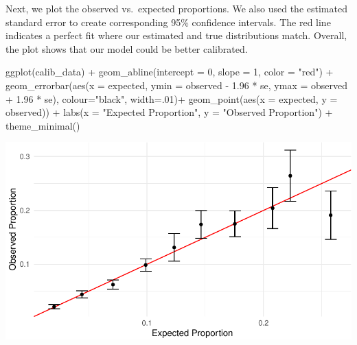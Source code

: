 \documentclass[
  letterpaper,
]{latex/krantz}
\makeatletter
\newenvironment{Shaded}{\begin{snugshade}}{\end{snugshade}}
\newcommand{\AttributeTok}[1]{\textcolor[rgb]{0.40,0.45,0.13}{#1}}
\newcommand{\DecValTok}[1]{\textcolor[rgb]{0.68,0.00,0.00}{#1}}
\newcommand{\FloatTok}[1]{\textcolor[rgb]{0.68,0.00,0.00}{#1}}
\newcommand{\FunctionTok}[1]{\textcolor[rgb]{0.28,0.35,0.67}{#1}}
\newcommand{\NormalTok}[1]{\textcolor[rgb]{0.00,0.23,0.31}{#1}}
\newcommand{\SpecialCharTok}[1]{\textcolor[rgb]{0.37,0.37,0.37}{#1}}
\newcommand{\StringTok}[1]{\textcolor[rgb]{0.13,0.47,0.30}{#1}}
\newenvironment{kframe}{%
\medskip{}
\setlength{\fboxsep}{.8em}
 \def\at@end@of@kframe{}%
 \ifinner\ifhmode%
  \def\at@end@of@kframe{\end{minipage}}%
  \begin{minipage}{\columnwidth}%
 \fi\fi%
 \def\FrameCommand##1{\hskip\@totalleftmargin \hskip-\fboxsep
 \colorbox{shadecolor}{##1}\hskip-\fboxsep
     \hskip-\linewidth \hskip-\@totalleftmargin \hskip\columnwidth}%
 \MakeFramed {\advance\hsize-\width
   \@totalleftmargin\z@ \linewidth\hsize
   \@setminipage}}%
 {\par\unskip\endMakeFramed%
 \at@end@of@kframe}
\renewenvironment{Shaded}{\begin{kframe}}{\end{kframe}}
\makeatother
\begin{document}
Next, we plot the observed vs.~expected proportions. We also used the
estimated standard error to create corresponding 95\% confidence
intervals. The red line indicates a perfect fit where our estimated and
true distributions match. Overall, the plot shows that our model could
be better calibrated.

\begin{Shaded}
\begin{Highlighting}[]
\FunctionTok{ggplot}\NormalTok{(calib\_data) }\SpecialCharTok{+} 
  \FunctionTok{geom\_abline}\NormalTok{(}\AttributeTok{intercept =} \DecValTok{0}\NormalTok{, }\AttributeTok{slope =} \DecValTok{1}\NormalTok{, }\AttributeTok{color =} \StringTok{"red"}\NormalTok{) }\SpecialCharTok{+} 
  \FunctionTok{geom\_errorbar}\NormalTok{(}\FunctionTok{aes}\NormalTok{(}\AttributeTok{x =}\NormalTok{ expected, }\AttributeTok{ymin =}\NormalTok{ observed }\SpecialCharTok{{-}} \FloatTok{1.96} \SpecialCharTok{*}\NormalTok{ se, }
                    \AttributeTok{ymax =}\NormalTok{ observed }\SpecialCharTok{+} \FloatTok{1.96} \SpecialCharTok{*}\NormalTok{ se), }
                \AttributeTok{colour=}\StringTok{"black"}\NormalTok{, }\AttributeTok{width=}\NormalTok{.}\DecValTok{01}\NormalTok{)}\SpecialCharTok{+}
  \FunctionTok{geom\_point}\NormalTok{(}\FunctionTok{aes}\NormalTok{(}\AttributeTok{x =}\NormalTok{ expected, }\AttributeTok{y =}\NormalTok{ observed)) }\SpecialCharTok{+}
  \FunctionTok{labs}\NormalTok{(}\AttributeTok{x =} \StringTok{"Expected Proportion"}\NormalTok{, }\AttributeTok{y =} \StringTok{"Observed Proportion"}\NormalTok{) }\SpecialCharTok{+}
  \FunctionTok{theme\_minimal}\NormalTok{()}
\end{Highlighting}
\end{Shaded}

\begin{center}
\includegraphics[width=1\textwidth,height=\textheight]{book/logistic_regression_files/figure-pdf/unnamed-chunk-17-1.pdf}
\end{center}
\end{document}
